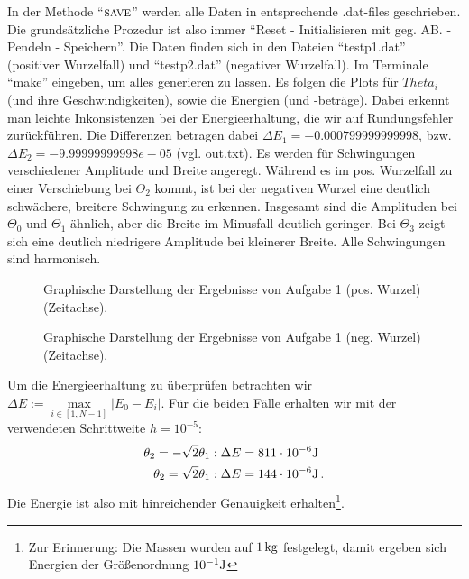 In der Methode \enquote{$\textsc{save}$} werden alle Daten in entsprechende .dat-files geschrieben. Die grundsätzliche Prozedur ist also immer \enquote{Reset - Initialisieren mit geg. AB. - Pendeln - Speichern}. Die Daten finden sich in den Dateien \enquote{testp1.dat} (positiver Wurzelfall) und \enquote{testp2.dat} (negativer Wurzelfall). Im Terminale \enquote{make} eingeben, um alles generieren zu lassen.
Es folgen die Plots für $Theta_i$ (und ihre Geschwindigkeiten), sowie die Energien (und -beträge). Dabei erkennt man leichte Inkonsistenzen bei der Energieerhaltung, die wir auf Rundungsfehler zurückführen. Die Differenzen betragen dabei $\Delta E_1 = -0.000799999999998$, bzw. $\Delta E_2 = -9.99999999998e-05$ (vgl. out.txt). Es werden  für Schwingungen verschiedener Amplitude und Breite angeregt. Während es im pos. Wurzelfall zu einer Verschiebung bei $\Theta_2$ kommt, ist bei der negativen Wurzel eine deutlich schwächere, breitere Schwingung zu erkennen. Insgesamt sind die Amplituden bei $\Theta_0$ und $\Theta_1$ ähnlich, aber die Breite im Minusfall deutlich geringer. Bei $\Theta_3$ zeigt sich eine deutlich niedrigere Amplitude bei kleinerer Breite. Alle Schwingungen sind harmonisch.
\begin{landscape}
	\begin{figure}
		\caption{Graphische Darstellung der Ergebnisse von Aufgabe 1 (pos. Wurzel) (Zeitachse).}
		\label{fig:OsziA11}
	\end{figure}
\end{landscape} 

\begin{landscape}
	\begin{figure}
		\caption{Graphische Darstellung der Ergebnisse von Aufgabe 1 (neg. Wurzel) (Zeitachse).}
		\label{fig:OsziA12}
	\end{figure}
\end{landscape} 
Um die Energieerhaltung zu überprüfen betrachten wir $\Delta E := \max\limits_{i \in [1, N-1]}\left|E_0 -
E_i\right|$. Für die beiden Fälle erhalten wir mit der verwendeten Schrittweite $h = 10^{-5}$:
\begin{equation}
	\begin{split}
		\theta_2 = - \sqrt{2}\theta_1&: \Delta E = 811 \cdot 10^{-6} \textup{J} \\
		\theta_2 = \sqrt{2}\theta_1&: \Delta E = 144 \cdot 10^{-6} \textup{J}\,. \\
	\end{split}
\end{equation}
Die Energie ist also mit hinreichender Genauigkeit erhalten\footnote{Zur Erinnerung: Die Massen
wurden auf $1\,\textup{kg}$ festgelegt, damit ergeben sich Energien der Größenordnung
$10^{-1}\textup{J}$}.

